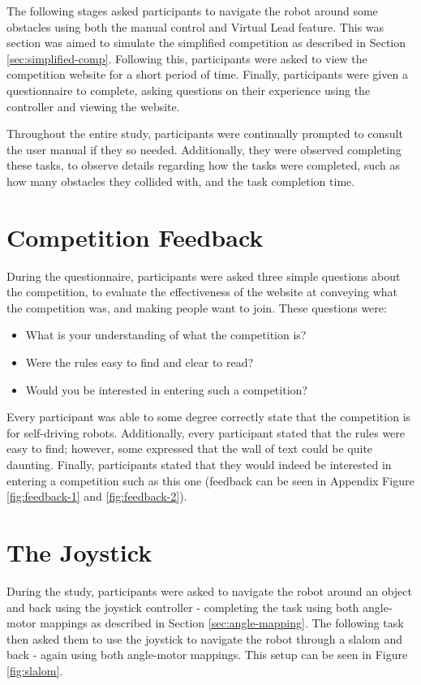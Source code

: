\documentclass{l4proj}
\begin{document}
The following stages asked participants to navigate the robot around some obstacles using both the manual control and Virtual Lead feature. This was section was aimed to simulate the simplified competition as described in Section \ref{sec:simplified-comp}. Following this, participants were asked to view the competition website for a short period of time. Finally, participants were given a questionnaire to complete, asking questions on their experience using the controller and viewing the website.
 
Throughout the entire study, participants were continually prompted to consult the user manual if they so needed. Additionally, they were observed completing these tasks, to observe details regarding how the tasks were completed, such as how many obstacles they collided with, and the task completion time.


\section{Competition Feedback}
During the questionnaire, participants were asked three simple questions about the competition, to evaluate the effectiveness of the website at conveying what the competition was, and making people want to join. These questions were:
\begin{itemize}
    \item What is your understanding of what the competition is?
    \item Were the rules easy to find and clear to read?
    \item Would you be interested in entering such a competition?
\end{itemize}

Every participant was able to some degree correctly state that the competition is for self-driving robots. Additionally, every participant stated that the rules were easy to find; however, some expressed that the wall of text could be quite daunting. Finally, participants stated that they would indeed be interested in entering a competition such as this one (feedback can be seen in Appendix Figure \ref{fig:feedback-1} and \ref{fig:feedback-2}).


\section{The Joystick}
During the study, participants were asked to navigate the robot around an object and back using the joystick controller - completing the task using both angle-motor mappings as described in Section \ref{sec:angle-mapping}. The following task then asked them to use the joystick to navigate the robot through a slalom and back - again using both angle-motor mappings. This setup can be seen in Figure \ref{fig:slalom}.
\end{document}

